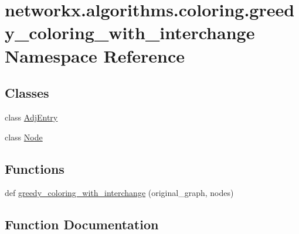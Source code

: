 \hypertarget{namespacenetworkx_1_1algorithms_1_1coloring_1_1greedy__coloring__with__interchange}{}\section{networkx.\+algorithms.\+coloring.\+greedy\+\_\+coloring\+\_\+with\+\_\+interchange Namespace Reference}
\label{namespacenetworkx_1_1algorithms_1_1coloring_1_1greedy__coloring__with__interchange}
\subsection*{Classes}
\begin{DoxyCompactItemize}
\item 
class \hyperlink{classnetworkx_1_1algorithms_1_1coloring_1_1greedy__coloring__with__interchange_1_1AdjEntry}{Adj\+Entry}
\item 
class \hyperlink{classnetworkx_1_1algorithms_1_1coloring_1_1greedy__coloring__with__interchange_1_1Node}{Node}
\end{DoxyCompactItemize}
\subsection*{Functions}
\begin{DoxyCompactItemize}
\item 
def \hyperlink{namespacenetworkx_1_1algorithms_1_1coloring_1_1greedy__coloring__with__interchange_a0372e0e5ff4dd34be35f2ef98f260dac}{greedy\+\_\+coloring\+\_\+with\+\_\+interchange} (original\+\_\+graph, nodes)
\end{DoxyCompactItemize}


\subsection{Function Documentation}
\mbox{\label{namespacenetworkx_1_1algorithms_1_1coloring_1_1greedy__coloring__with__interchange_a0372e0e5ff4dd34be35f2ef98f260dac}} 
